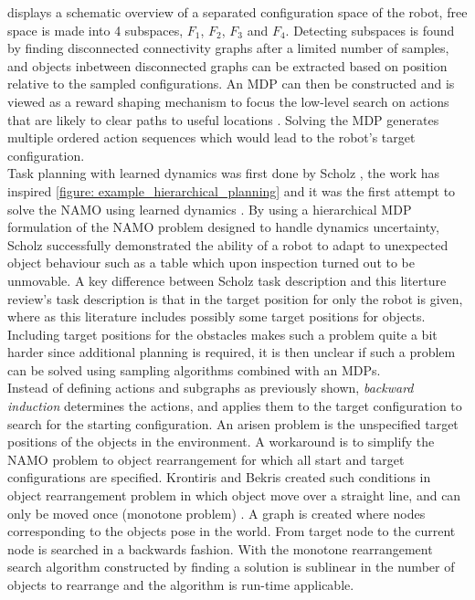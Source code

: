  displays a schematic overview of a separated configuration space of the robot, free space is made into 4 subspaces, $F_1$, $F_2$, $F_3$ and $F_4$. Detecting subspaces is found by finding disconnected connectivity graphs after a limited number of samples, and objects inbetween disconnected graphs can be extracted based on position relative to the sampled configurations. An \ac{MDP} can then be constructed and is viewed as a reward shaping mechanism to focus the low-level search on actions that are likely to clear paths to useful locations \cite{scholz_navigation_2016}. Solving the \ac{MDP} generates multiple ordered action sequences which would lead to the robot's target configuration. \\

Task planning with learned dynamics was first done by Scholz \cite{scholz_navigation_2016}, the work has inspired \cref{figure: example_hierarchical_planning} and it was the first attempt to solve the \ac{NAMO} using learned dynamics \cite{scholz_learning_2015}.  By using a hierarchical \ac{MDP} formulation of the \ac{NAMO} problem designed to handle dynamics uncertainty, Scholz successfully demonstrated the ability of a robot to adapt to unexpected object behaviour such as a table which upon inspection turned out to be unmovable. A key difference between Scholz task description and this literture review's task description is that in \cite{scholz_navigation_2016} the target position for only the robot is given, where as this literature includes possibly some target positions for objects. Including target positions for the obstacles makes such a problem quite a bit harder since additional planning is required, it is then unclear if such a problem can be solved using sampling algorithms combined with an \acp{MDP}.\\

Instead of defining actions and subgraphs as previously shown, \textit{backward induction} determines the actions, and applies them to the target configuration to search for the starting configuration. An arisen problem is the unspecified target positions of the objects in the environment. A workaround is to simplify the \ac{NAMO} problem to object rearrangement for which all start and target configurations are specified. Krontiris and Bekris created such conditions in object rearrangement problem in which object move over a straight line, and can only be moved once (monotone problem) \cite{krontiris_dealing_2015}. A graph is created where nodes corresponding to the objects pose in the world. From target node to the current node is searched in a backwards fashion. With the monotone rearrangement search algorithm constructed by \cite{krontiris_dealing_2015} finding a solution is sublinear in the number of objects to rearrange and the algorithm is run-time applicable. \\

